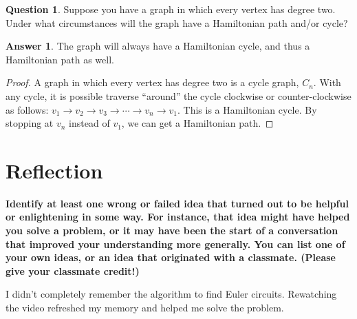 \documentclass[article, 12pt]{article}
\theoremstyle{definition}
\newtheorem{question}{Question}
\newtheorem{answer}{Answer}
\begin{document}
    \begin{question}
        Suppose you have a graph in which every vertex has degree two. Under what circumstances will the graph have a Hamiltonian path and/or cycle?
    \end{question}
    \begin{answer}
        The graph will always have a Hamiltonian cycle, and thus a Hamiltonian path as well. 

        \begin{proof}
            A graph in which every vertex has degree two is a cycle graph, $C_n$. With any cycle, it is possible traverse ``around'' the cycle clockwise or counter-clockwise as follows: $v_1 \rightarrow v_2 \rightarrow v_3 \rightarrow \cdots \rightarrow v_n \rightarrow v_1$. This is a Hamiltonian cycle. By stopping at $v_n$ instead of $v_1$, we can get a Hamiltonian path.
        \end{proof}
    \end{answer}
    \section{Reflection}
    \textbf{Identify at least one wrong or failed idea that turned out to be helpful or enlightening in some way. For instance, that idea might have helped you solve a problem, or it may have been the start of a conversation that improved your understanding more generally. You can list one of your own ideas, or an idea that originated with a classmate. (Please give your classmate credit!)}

    I didn't completely remember the algorithm to find Euler circuits. Rewatching the video refreshed my memory and helped me solve the problem.
\end{document}
